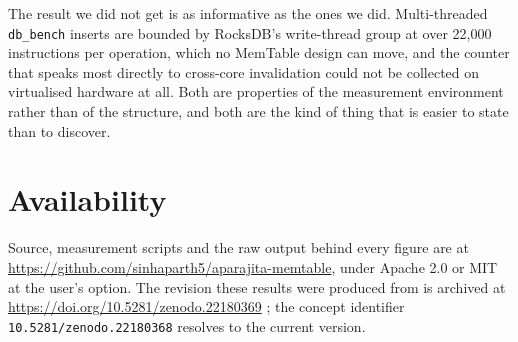 \documentclass[conference]{IEEEtran}
\begin{document}
The result we did not get is as informative as the ones we did. Multi-threaded
\texttt{db\_bench} inserts are bounded by RocksDB's write-thread group at over
22{,}000 instructions per operation, which no MemTable design can move, and the
counter that speaks most directly to cross-core invalidation could not be
collected on virtualised hardware at all. Both are properties of the measurement
environment rather than of the structure, and both are the kind of thing that is
easier to state than to discover.

\section*{Availability}

Source, measurement scripts and the raw output behind every figure are at
\url{https://github.com/sinhaparth5/aparajita-memtable}, under Apache 2.0 or MIT
at the user's option. The revision these results were produced from is archived at
\mbox{\url{https://doi.org/10.5281/zenodo.22180369}} \cite{aparajita}; the concept identifier
\mbox{\texttt{10.5281/zenodo.22180368}} resolves to the current version.



\end{document}
